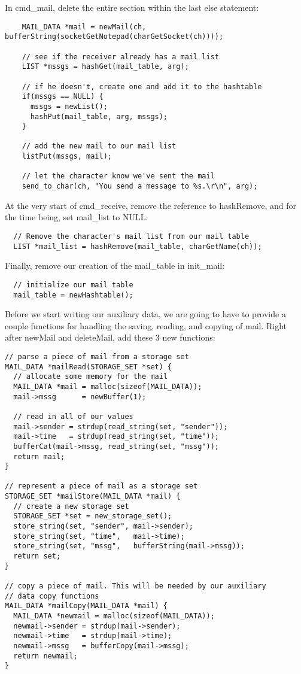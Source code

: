 \documentclass[12pt]{article}
\begin{document}
In cmd\_mail, delete the entire section within the last else statement:
{\bf \begin{verbatim}
    MAIL_DATA *mail = newMail(ch, bufferString(socketGetNotepad(charGetSocket(ch))));
    
    // see if the receiver already has a mail list
    LIST *mssgs = hashGet(mail_table, arg);
    
    // if he doesn't, create one and add it to the hashtable
    if(mssgs == NULL) {
      mssgs = newList();
      hashPut(mail_table, arg, mssgs);
    }

    // add the new mail to our mail list
    listPut(mssgs, mail);

    // let the character know we've sent the mail
    send_to_char(ch, "You send a message to %s.\r\n", arg);
\end{verbatim}}

At the very start of cmd\_receive, remove the reference to hashRemove, and for the time being, set mail\_list to NULL:
{\bf \begin{verbatim}
  // Remove the character's mail list from our mail table
  LIST *mail_list = hashRemove(mail_table, charGetName(ch));
\end{verbatim}}
  
Finally, remove our creation of the mail\_table in init\_mail:
{\bf \begin{verbatim}
  // initialize our mail table
  mail_table = newHashtable();
\end{verbatim}}

Before we start writing our auxiliary data, we are going to have to provide a couple functions for handling the saving, reading, and copying of mail. Right after newMail and deleteMail, add these 3 new functions:
{\bf \begin{verbatim}
// parse a piece of mail from a storage set
MAIL_DATA *mailRead(STORAGE_SET *set) {
  // allocate some memory for the mail
  MAIL_DATA *mail = malloc(sizeof(MAIL_DATA));
  mail->mssg      = newBuffer(1);

  // read in all of our values
  mail->sender = strdup(read_string(set, "sender"));
  mail->time   = strdup(read_string(set, "time"));
  bufferCat(mail->mssg, read_string(set, "mssg"));
  return mail;
}

// represent a piece of mail as a storage set
STORAGE_SET *mailStore(MAIL_DATA *mail) {
  // create a new storage set
  STORAGE_SET *set = new_storage_set();
  store_string(set, "sender", mail->sender);
  store_string(set, "time",   mail->time);
  store_string(set, "mssg",   bufferString(mail->mssg));
  return set;
}

// copy a piece of mail. This will be needed by our auxiliary
// data copy functions
MAIL_DATA *mailCopy(MAIL_DATA *mail) {
  MAIL_DATA *newmail = malloc(sizeof(MAIL_DATA));
  newmail->sender = strdup(mail->sender);
  newmail->time   = strdup(mail->time);
  newmail->mssg   = bufferCopy(mail->mssg);
  return newmail;
}
\end{verbatim}}
  
\end{document}
